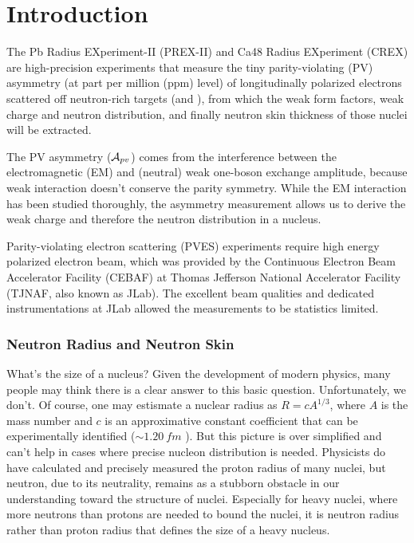 \chapter{Introduction}
The Pb Radius EXperiment-II (PREX-II) and Ca48 Radius EXperiment (CREX) are 
high-precision experiments that measure the tiny parity-violating (PV) asymmetry 
(at part per million (ppm) level) of longitudinally polarized electrons scattered 
off neutron-rich targets (\Pb and \Ca), from which the weak form factors, weak
charge and neutron distribution, and finally
neutron skin thickness of those nuclei will be extracted.

The PV asymmetry ($\mathcal{A}_{pv}$) comes from the interference between the 
electromagnetic (EM) and (neutral) weak one-boson exchange amplitude, because weak 
interaction doesn't conserve the parity symmetry. While the EM 
interaction has been studied thoroughly, the asymmetry measurement allows 
us to derive the weak charge and therefore the neutron distribution in a nucleus.

Parity-violating electron scattering (PVES) experiments require high energy polarized
electron beam, which was provided by the Continuous Electron Beam Accelerator
Facility (CEBAF) at Thomas Jefferson National Accelerator Facility (TJNAF, 
also known as JLab). The excellent beam qualities and dedicated instrumentations
at JLab allowed the measurements to be statistics limited.


\subsection{Neutron Radius and Neutron Skin}
What's the size of a nucleus? Given the development of modern physics, many people may
think there is a clear answer to this basic question. Unfortunately, we don't.
Of course, one may estismate a nuclear radius as $R = cA^{1/3}$, where $A$ is the mass
number and $c$ is an approximative constant coefficient that can be experimentally 
identified ($\sim 1.20\ fm$ \cite{FIXME}). But this picture is
over simplified and can't help in cases where precise nucleon distribution is needed.
Physicists do have calculated and precisely measured the proton radius of many nuclei,
but neutron, due to its neutrality, remains as a stubborn obstacle in 
our understanding toward the structure of nuclei. Especially for heavy nuclei,
where more neutrons than protons are needed to bound the nuclei, it is neutron
radius rather than proton radius that defines the size of a heavy nucleus.

